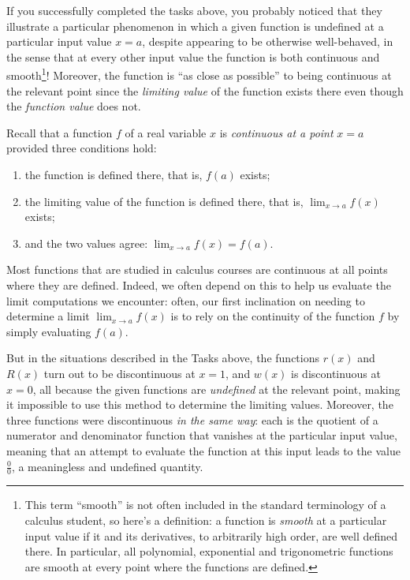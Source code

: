 \documentclass[11pt]{article}
\begin{document}
\bigskip
If you successfully completed the tasks above, you probably noticed that they illustrate a particular phenomenon in which a given function is undefined at a particular input value $x=a$, despite appearing to be otherwise well-behaved, in the sense that at every other input value the function is both continuous and smooth\footnote{This term ``smooth'' is not often included in the standard terminology of a calculus student, so here's a definition: a function is \emph{smooth} at a particular input value if it and its derivatives, to arbitrarily high order, are well defined there. In particular, all polynomial, exponential and trigonometric functions are smooth at every point where the functions are defined.}! Moreover, the function is ``as close as possible'' to being continuous at the relevant point since the \emph{limiting value} of the function exists there even though the \emph{function value} does not.

Recall that a function $f$ of a real variable $x$ is \emph{continuous at a point} $x=a$ provided three conditions hold:
\begin{enumerate} \itemsep -3pt
\item the function is defined there, that is, $f(a)$ exists;
\item the limiting value of the function is defined there, that is, ${\displaystyle\lim_{x\rightarrow a} f(x)}$ exists;
\item and the two values agree: ${\displaystyle\lim_{x\rightarrow a} f(x)=f(a).}$
\end{enumerate}
Most functions that are studied in calculus courses are continuous at all points where they are defined. Indeed, we often depend on this to help us evaluate the limit computations we encounter: often, our first inclination on needing to determine a limit ${\displaystyle \lim_{x\rightarrow a} f(x)}$ is to rely on the continuity of the function $f$ by simply evaluating $f(a)$.

But in the situations described in the Tasks above, the functions $r(x)$ and $R(x)$ turn out to be discontinuous at $x=1$, and $w(x)$ is discontinuous at $x=0$, all because the given functions are \emph{undefined} at the relevant point, making it impossible to use this method to determine the limiting values. Moreover, the three functions were discontinuous \emph{in the same way}: each is the quotient of a numerator and denominator function that vanishes at the particular input value, meaning that an attempt to evaluate the function at this input leads to the value $\frac00$, a meaningless and undefined quantity.
\end{document}
